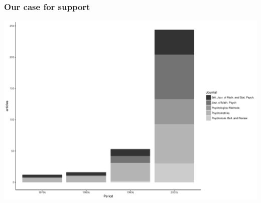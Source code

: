 \begin{frame}
	\frametitle{Our case for support}

		\includegraphics[width=\textwidth]{psyarticles.pdf}
\end{frame}



%
%
%
%
%
%

